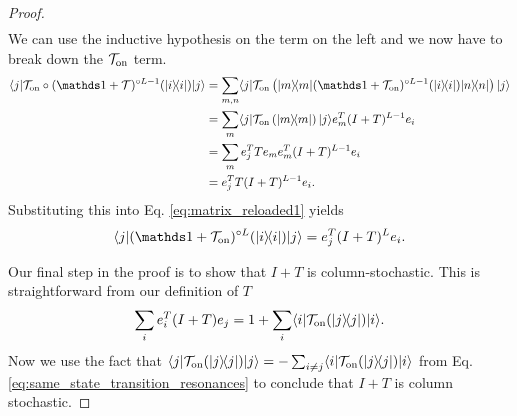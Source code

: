 \begin{proof}
\begin{align}
\end{align}
We can use the inductive hypothesis on the term on the left and we now have to break down the $\mathcal{T}_{\rm on}$ term. 
\begin{align}
    \bra{j} \mathcal{T}_{\on} \circ (\identity + \mathcal{T})^{\circ L - 1} (\ketbra{i}{i}) \ket{j} &= \sum_{m, n} \bra{j} \mathcal{T}_{\on}\left( \ketbra{m}{m} (\identity + \mathcal{T}_{\on})^{\circ L - 1} (\ketbra{i}{i}) \ketbra{n}{n} \right) \ket{j} \\
    &= \sum_{m} \bra{j} \mathcal{T}_{\on} \left( \ketbra{m}{m} \right) \ket{j} e_m^T (I + T)^{L - 1} e_i \\
    &= \sum_m e_j^T T e_m e_m^T (I + T)^{L -1} e_i \\
    &= e_j^T T(I + T)^{L-1} e_i.
\end{align}
Substituting this into Eq. \eqref{eq:matrix_reloaded1} yields \begin{equation}
     \bra{j} (\identity + \mathcal{T}_{\on})^{\circ L}(\ketbra{i}{i}) \ket{j} = e_j^T (I + T)^{L} e_i.
\end{equation} 


Our final step in the proof is to show that $I + T$ is column-stochastic. This is straightforward from our definition of $T$
\begin{equation}
    \sum_i e_i^T (I + T) e_j = 1 + \sum_i \langle i| \mathcal{T}_{\rm on}(| j\rangle\! \langle j|) |i\rangle.
\end{equation}
Now we use the fact that $\langle j| \mathcal{T}_{\rm on}(| j\rangle\! \langle j|) |j\rangle = - \sum_{i \neq j} \langle i| \mathcal{T}_{\rm on}(| j\rangle\! \langle j|) |i\rangle$ from Eq. \eqref{eq:same_state_transition_resonances} to conclude that $I + T$ is column stochastic.
\end{proof}

